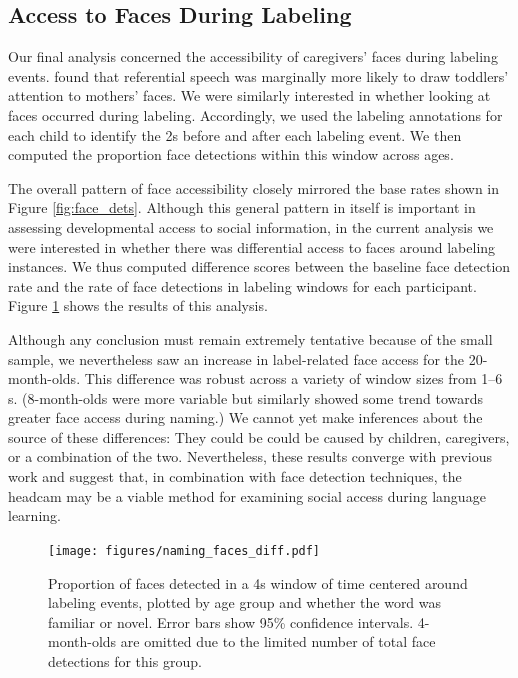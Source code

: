 \documentclass[10pt,letterpaper]{article}
\begin{document}
\subsection{Access to Faces During Labeling}

Our final analysis concerned the accessibility of caregivers' faces during labeling events.  found that referential speech was marginally more likely to draw toddlers' attention to mothers' faces. We were similarly interested in whether looking at faces occurred during labeling. Accordingly, we used the labeling annotations for each child to identify the 2s before and after each labeling event. We then computed the proportion face detections within this window across ages. 

The overall pattern of face accessibility closely mirrored the base rates shown in Figure \ref{fig:face_dets}. Although this general pattern in itself is important in assessing developmental access to social information, in the current analysis we were interested in whether there was differential access to faces around labeling instances. We thus computed difference scores between the baseline face detection rate and the rate of face detections in labeling windows for each participant. Figure \ref{fig:naming_face} shows the results of this analysis. 

Although any conclusion must remain extremely tentative because of the small sample, we nevertheless saw an increase in label-related face access for the 20-month-olds. This difference was robust across a variety of window sizes from 1--6 s. (8-month-olds were more variable but similarly showed some trend towards greater face access during naming.) We cannot yet make inferences about the source of these differences: They could be could be caused by children, caregivers, or a combination of the two. Nevertheless, these results converge with previous work and suggest that, in combination with face detection techniques, the headcam may be a viable method for examining social access during language learning.

\begin{figure}
\begin{center}
  \texttt{[image: figures/naming\_faces\_diff.pdf]}
\end{center}
\caption{\label{fig:naming_face} Proportion of faces detected in a 4s window of time centered around labeling events, plotted by age group and whether the word was familiar or novel. Error bars show 95\% confidence intervals. 4-month-olds are omitted due to the limited number of total face detections for this group.} 
\end{figure}
\end{document}
